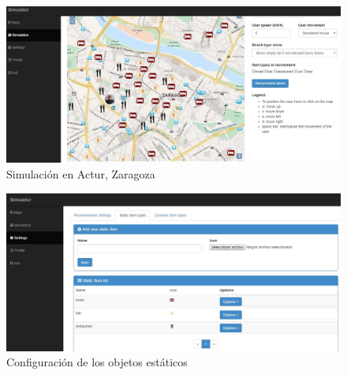\begin{figure}[H]
\centering\includegraphics[scale=0.3]{imagenes/resumen-simulador.jpg}
\caption{Simulación en Actur, Zaragoza}
\label{simulacionActur}
\end{figure}

\begin{figure}[H]
\centering\includegraphics[scale=0.3]{imagenes/config-objetos-estaticos.jpg}
\caption{Configuración de los objetos estáticos}
\label{ConfigStaticItem}
\end{figure}